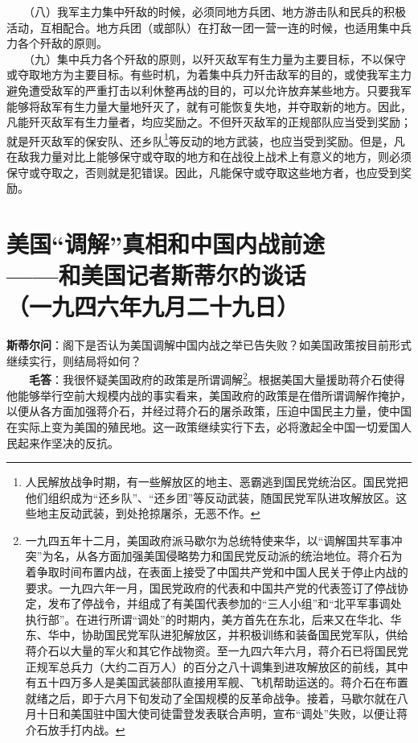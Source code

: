 \documentclass[cn,11pt,chinese]{elegantbook}
\def\myformat#1{\hfil\hfil #1}
\begin{document}
　　（八）我军主力集中歼敌的时候，必须同地方兵团、地方游击队和民兵的积极活动，互相配合。地方兵团（或部队）在打敌一团一营一连的时候，也适用集中兵力各个歼敌的原则。\\
　　（九）集中兵力各个歼敌的原则，以歼灭敌军有生力量为主要目标，不以保守或夺取地方为主要目标。有些时机，为着集中兵力歼击敌军的目的，或使我军主力避免遭受敌军的严重打击以利休整再战的目的，可以允许放弃某些地方。只要我军能够将敌军有生力量大量地歼灭了，就有可能恢复失地，并夺取新的地方。因此，凡能歼灭敌军有生力量者，均应奖励之。不但歼灭敌军的正规部队应当受到奖励；就是歼灭敌军的保安队、还乡队\footnote[8]{ 人民解放战争时期，有一些解放区的地主、恶霸逃到国民党统治区。国民党把他们组织成为“还乡队”、“还乡团”等反动武装，随国民党军队进攻解放区。这些地主反动武装，到处抢掠屠杀，无恶不作。}等反动的地方武装，也应当受到奖励。但是，凡在敌我力量对比上能够保守或夺取的地方和在战役上战术上有意义的地方，则必须保守或夺取之，否则就是犯错误。因此，凡能保守或夺取这些地方者，也应受到奖励。\\
\newpage\section*{\myformat{美国“调解”真相和中国内战前途}\\\myformat{——和美国记者斯蒂尔的谈话}\\\myformat{（一九四六年九月二十九日）}}
\textbf{斯蒂尔问}：阁下是否认为美国调解中国内战之举已告失败？如美国政策按目前形式继续实行，则结局将如何？\\
　　\textbf{毛答}：我很怀疑美国政府的政策是所谓调解\footnote[1]{ 一九四五年十二月，美国政府派马歇尔为总统特使来华，以“调解国共军事冲突”为名，从各方面加强美国侵略势力和国民党反动派的统治地位。蒋介石为着争取时间布置内战，在表面上接受了中国共产党和中国人民关于停止内战的要求。一九四六年一月，国民党政府的代表和中国共产党的代表签订了停战协定，发布了停战令，并组成了有美国代表参加的“三人小组”和“北平军事调处执行部”。在进行所谓“调处”的时期内，美方首先在东北，后来又在华北、华东、华中，协助国民党军队进犯解放区，并积极训练和装备国民党军队，供给蒋介石以大量的军火和其它作战物资。至一九四六年六月，蒋介石已将国民党正规军总兵力（大约二百万人）的百分之八十调集到进攻解放区的前线，其中有五十四万多人是美国武装部队直接用军舰、飞机帮助运送的。蒋介石在布置就绪之后，即于六月下旬发动了全国规模的反革命战争。接着，马歇尔就在八月十日和美国驻中国大使司徒雷登发表联合声明，宣布“调处”失败，以便让蒋介石放手打内战。}。根据美国大量援助蒋介石使得他能够举行空前大规模内战的事实看来，美国政府的政策是在借所谓调解作掩护，以便从各方面加强蒋介石，并经过蒋介石的屠杀政策，压迫中国民主力量，使中国在实际上变为美国的殖民地。这一政策继续实行下去，必将激起全中国一切爱国人民起来作坚决的反抗。\\
\end{document}
